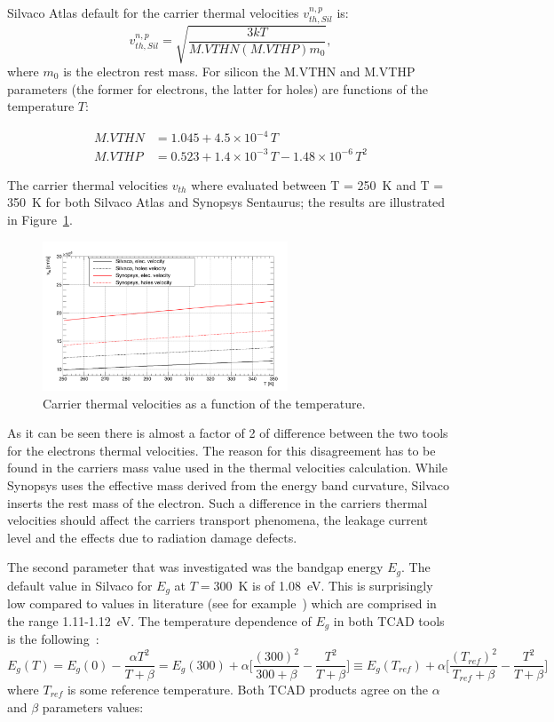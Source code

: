 \noindent Silvaco Atlas default for the carrier thermal velocities $v_{th,Sil}^{n,p}$ is:
\begin{equation}
v_{th,Sil}^{n,p} = \sqrt{\dfrac{3kT}{M.VTHN(M.VTHP)m_0}},
\label{eq:SilThVel}
\end{equation}
where $m_0$ is the electron rest mass. 
For silicon the M.VTHN and M.VTHP parameters (the former for electrons, the latter for holes) 
 are functions of the temperature $T$:

\begin{align}
M.VTHN & = 1.045 + 4.5\times10^{-4}\,T\\
M.VTHP & =    0.523 + 1.4 \times10^{-3}\,T -1.48\times10^{-6}\,T^2
\end{align}

The carrier thermal velocities $v_{th}$ where evaluated between T = 250~K and T = 350~K for both 
Silvaco Atlas and Synopsys Sentaurus; 
the results 
are illustrated in Figure~\ref{fig:vtherm}.

\begin{figure}[!htbp]
\centering
\includegraphics[width=0.65\textwidth]{vtherm}
\caption{\label{fig:vtherm}Carrier thermal velocities as a function of the temperature.}
\end{figure}
\noindent As it can be seen there is almost a factor of 2 of difference between the two tools for the electrons 
thermal velocities. The reason for this disagreement has to be found in the carriers  mass value
used in the thermal velocities calculation. While Synopsys uses the effective  mass derived 
from the energy band curvature, Silvaco inserts the rest mass of the electron. 
Such a difference in the  carriers thermal velocities should affect the carriers transport phenomena, 
the leakage current level and the effects due to radiation damage defects. 
 
 The second parameter that was investigated was the bandgap energy $E_g$. The default value in 
 Silvaco for $E_g$ at $T=$300~K is of 1.08~eV. This is surprisingly low compared to values in literature 
 (see for example~\cite{Lutz:411172,Sze1981,Wang1989,Shockley}) which are comprised 
 in the range 1.11-1.12~eV.
The temperature dependence of $E_g$ in both TCAD tools is the following~\cite{Sze1981}:
\begin{equation}
E_g(T)=E_g(0) -\dfrac{\alpha T^2}{T+\beta}=E_g(300)+\alpha\Bigg[ \dfrac{(300)^2}{300+\beta}-\dfrac{T^2}{T+\beta}  \Bigg] \equiv E_g(T_{ref})+\alpha\Bigg[ \dfrac{(T_{ref})^2}{T_{ref}+\beta}-\dfrac{T^2}{T+\beta}  \Bigg] 
\label{eq:EgT}
\end{equation}
where $T_{ref}$ is some reference temperature.
Both TCAD products agree on the $\alpha$ and $\beta$ parameters values:

